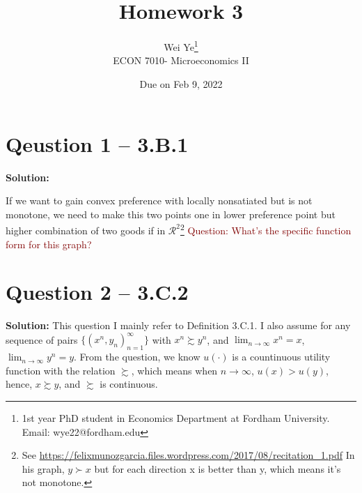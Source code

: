 \documentclass[11pt]{article} %
\title{Homework 3}
\author{Wei Ye\footnote{ 1st year PhD student in Economics Department at Fordham University. Email: wye22@fordham.edu}
    \\ ECON 7010- Microeconomics II}
\date{Due on Feb 9, 2022}
\begin{document}
\maketitle

\section{Qeustion 1 -- 3.B.1}
\textbf{Solution:}

If we want to gain convex preference with locally nonsatiated but is not monotone, we need to make this two points one in lower preference point but higher combination of two goods if in $\mathcal{R}^2$\footnote{See \url{https://felixmunozgarcia.files.wordpress.com/2017/08/recitation_1.pdf} In his graph, $y\succ x$ but for each direction x is better than y, which means it's not monotone. }
\textcolor{Maroon}{Question: What's the specific function form for this graph?}




\section{Question 2 -- 3.C.2}
\textbf{Solution:}
This question I mainly refer to Definition 3.C.1. I also assume for any sequence of pairs $\{(x^n,y_n)_{n=1}^\infty\}$ with $x^n \succsim y^n$, and $\lim_{n\rightarrow\infty} x^n=x$, $\lim_{n\rightarrow\infty} y^n=y$. 
From the question, we know $u(\cdot)$ is a countinuous utility function with the relation $\succsim$, which means when $n\rightarrow \infty$, $u(x)>u(y)$, hence, $x\succsim y$, and $\succsim$ is continuous.
\end{document}

